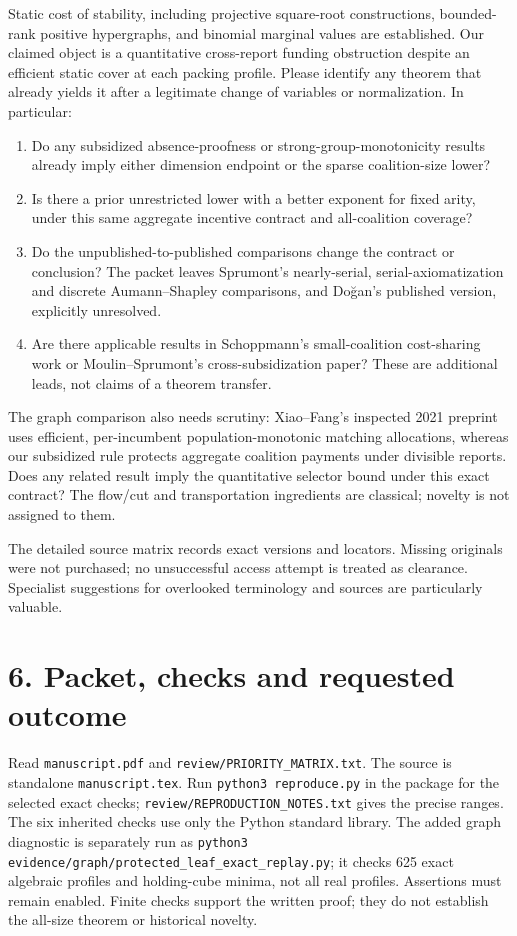 \documentclass[11pt]{article}
\begin{document}
Static cost of stability, including projective square-root constructions,
bounded-rank positive hypergraphs, and binomial marginal values are established.
Our claimed object is a quantitative cross-report funding obstruction despite
an efficient static cover at each packing profile. Please identify any theorem
that already yields it after a legitimate change of variables or normalization.
In particular:
\begin{enumerate}
\item Do any subsidized absence-proofness or strong-group-monotonicity results
already imply either dimension endpoint or the sparse coalition-size lower?
\item Is there a prior unrestricted lower with a better exponent for fixed
arity, under this same aggregate incentive contract and all-coalition coverage?
\item Do the unpublished-to-published comparisons change the contract or
conclusion? The packet leaves Sprumont's nearly-serial, serial-axiomatization
and discrete Aumann--Shapley comparisons, and Do\u{g}an's published version,
explicitly unresolved.
\item Are there applicable results in Schoppmann's small-coalition cost-sharing
work or Moulin--Sprumont's cross-subsidization paper? These are additional
leads, not claims of a theorem transfer.
\end{enumerate}
The graph comparison also needs scrutiny: Xiao--Fang's inspected 2021 preprint
uses efficient, per-incumbent population-monotonic matching allocations, whereas
our subsidized rule protects aggregate coalition payments under divisible
reports. Does any related result imply the quantitative selector bound under
this exact contract? The flow/cut and transportation ingredients are classical;
novelty is not assigned to them.

The detailed source matrix records exact versions and locators. Missing
originals were not purchased; no unsuccessful access attempt is treated as
clearance. Specialist suggestions for overlooked terminology and sources are
particularly valuable.

\section*{6. Packet, checks and requested outcome}
Read \texttt{manuscript.pdf} and \nolinkurl{review/PRIORITY_MATRIX.txt}.
The source is standalone \texttt{manuscript.tex}. Run
\texttt{python3 reproduce.py} in the package for the selected exact checks;
\nolinkurl{review/REPRODUCTION_NOTES.txt} gives the precise ranges. The six inherited checks use only
the Python standard library. The added graph diagnostic is separately run as
\texttt{python3 evidence/graph/protected\_leaf\_exact\_replay.py}; it checks
625 exact algebraic profiles and holding-cube minima, not all real profiles. Assertions must remain enabled. Finite checks support the
written proof; they do not establish the all-size theorem or historical novelty.
\end{document}
